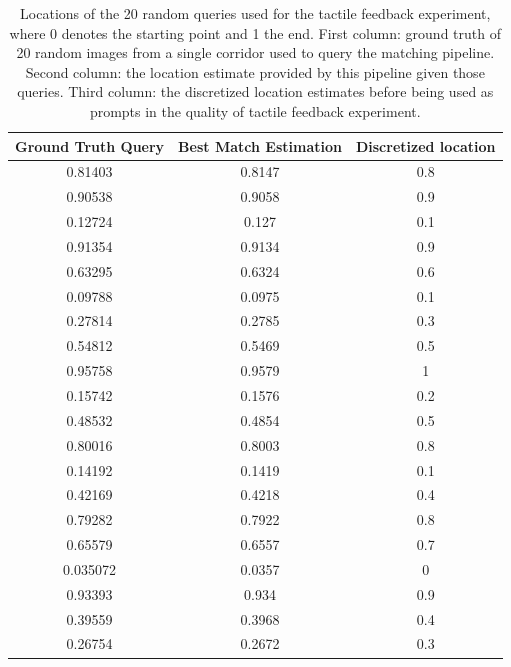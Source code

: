 \begin{table}
    \centering
  \begin{tabular}{ccc}
     Ground Truth Query &  Best Match Estimation &  Discretized location \\ \hline
    0.81403             & 0.8147                   & 0.8                   \\ \hline
    0.90538             & 0.9058                   & 0.9                   \\ \hline
    0.12724             & 0.127                    & 0.1                   \\ \hline
    0.91354             & 0.9134                   & 0.9                   \\ \hline
    0.63295             & 0.6324                   & 0.6                   \\ \hline
    0.09788             & 0.0975                   & 0.1                   \\ \hline
    0.27814             & 0.2785                   & 0.3                   \\ \hline
    0.54812             & 0.5469                   & 0.5                   \\ \hline
    0.95758             & 0.9579                   & 1                     \\ \hline
    0.15742             & 0.1576                   & 0.2                   \\ \hline
    0.48532             & 0.4854                   & 0.5                   \\ \hline
    0.80016             & 0.8003                   & 0.8                   \\ \hline
    0.14192             & 0.1419                   & 0.1                   \\ \hline
    0.42169             & 0.4218                   & 0.4                   \\ \hline
    0.79282             & 0.7922                   & 0.8                   \\ \hline
    0.65579             & 0.6557                   & 0.7                   \\ \hline
    0.035072            & 0.0357                   & 0                     \\ \hline
    0.93393             & 0.934                    & 0.9                   \\ \hline
    0.39559             & 0.3968                   & 0.4                   \\ \hline
    0.26754             & 0.2672                   & 0.3                   \\ \hline
    \end{tabular}
 \caption{Locations of the 20 random queries used for the tactile feedback experiment, where 0 denotes the starting point and 1 the end. First column: ground truth of 20 random images from a single corridor used to query the matching pipeline. Second column: the location estimate provided by this pipeline given those queries. Third column: the discretized location estimates before being used as prompts in the quality of tactile feedback experiment.}
\label{tab:20queriesResults}
\end{table}


